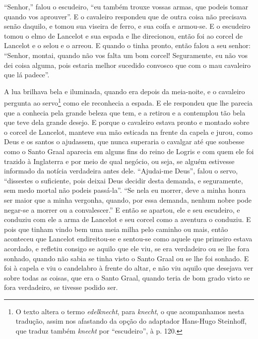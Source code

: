 “Senhor,” falou o escudeiro, “eu também trouxe vossas armas, que podeis tomar
quando vos aprouver”. E o cavaleiro respondeu que de outra coisa não precisava
senão daquilo, e tomou sua viseira de ferro, e sua coifa e armou-se. E o
escudeiro tomou o elmo de Lancelot e sua espada e lhe direcionou, então foi ao
corcel de Lancelot e o selou e o arreou. E quando o tinha pronto, então falou
a seu senhor: “Senhor, montai, quando não vos falta um bom corcel! Seguramente,
eu não vos dei coisa alguma, pois estaria melhor sucedido convosco que com o
mau cavaleiro que lá padece”. 

A lua brilhava bela e iluminada, quando era depois da meia-noite, e o cavaleiro
pergunta ao servo\footnote{ O texto altera o termo \textit{edelknecht},
para \textit{knecht},  o que acompanhamos nesta tradução,
assim nos afastando da opção do adaptador Hans-Hugo Steinhoff, que traduz
também \textit{knecht} por “escudeiro”,  à p. 120.}  como ele reconhecia a espada. E ele
respondeu que lhe parecia que a conhecia pela grande beleza que tem, e a
retirou e a contemplou tão bela que teve dela grande desejo. E porque o
cavaleiro estava pronto e montado sobre o corcel de Lancelot, manteve sua mão
esticada na frente da capela e jurou, como Deus e os santos o ajudassem, que
nunca superaria o cavalgar até que soubesse como o Santo Graal aparecia em
alguns fins do reino de Logris e com quem ele foi trazido à Inglaterra e por
meio de qual negócio, ou seja, se alguém estivesse informado da notícia
verdadeira antes dele. “Ajudai-me Deus”, falou o servo, “dissestes o
suficiente, pois deixai Deus decidir desta demanda, e seguramente, sem medo
mortal não podeis passá-la”. “Se nela eu morrer, deve a minha honra ser maior
que a minha vergonha, quando, por essa demanda, nenhum nobre pode negar-se a
morrer ou a convalescer.” E então se apartou, ele e seu escudeiro, e
conduziu com ele a arma de Lancelot e seu corcel como a aventura o conduziu. E
pois que tinham vindo bem uma meia milha pelo caminho ou mais, então aconteceu
que Lancelot endireitou-se e sentou-se como aquele que primeiro estava
acordado, e refletiu consigo se aquilo que ele viu, se era verdadeiro ou se lhe
fora sonhado, quando não sabia se tinha visto o Santo Graal  ou se lhe foi
sonhado. E foi à capela e viu o candelabro à frente do altar, e não viu aquilo
que desejava ver sobre todas as coisas, que era o Santo Graal, quando teria de
bom grado visto se fora verdadeiro, se tivesse podido ser.

